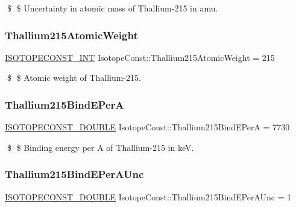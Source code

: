 \$ \$ Uncertainty in atomic mass of Thallium-\/215 in amu. \mbox{\label{group___isotope_const-_thallium-_tl215_ga8e900e4f2c39ce579bed7f440e2ae574}} 
\subsubsection{\texorpdfstring{Thallium215\+Atomic\+Weight}{Thallium215AtomicWeight}}
{\footnotesize\ttfamily \mbox{\hyperlink{group___isotope_const-_macros_ga5f18360b3e99483a35c32d789e62621c}{I\+S\+O\+T\+O\+P\+E\+C\+O\+N\+S\+T\+\_\+\+I\+NT}} Isotope\+Const\+::\+Thallium215\+Atomic\+Weight = 215}

\$ \$ Atomic weight of Thallium-\/215. \mbox{\label{group___isotope_const-_thallium-_tl215_gab3ad2ea8fb314f18d88570aa97ce2ccf}} 
\subsubsection{\texorpdfstring{Thallium215\+Bind\+E\+PerA}{Thallium215BindEPerA}}
{\footnotesize\ttfamily \mbox{\hyperlink{group___isotope_const-_macros_ga8f45a7272ce02c0b4c65c44636ed719a}{I\+S\+O\+T\+O\+P\+E\+C\+O\+N\+S\+T\+\_\+\+D\+O\+U\+B\+LE}} Isotope\+Const\+::\+Thallium215\+Bind\+E\+PerA = 7730}

\$ \$ Binding energy per A of Thallium-\/215 in keV. \mbox{\label{group___isotope_const-_thallium-_tl215_ga2dab42a7bbfe1b6b099fea0e554fc2da}} 
\subsubsection{\texorpdfstring{Thallium215\+Bind\+E\+Per\+A\+Unc}{Thallium215BindEPerAUnc}}
{\footnotesize\ttfamily \mbox{\hyperlink{group___isotope_const-_macros_ga8f45a7272ce02c0b4c65c44636ed719a}{I\+S\+O\+T\+O\+P\+E\+C\+O\+N\+S\+T\+\_\+\+D\+O\+U\+B\+LE}} Isotope\+Const\+::\+Thallium215\+Bind\+E\+Per\+A\+Unc = 1}

